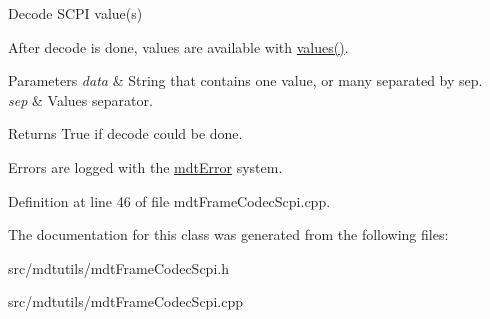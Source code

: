 Decode SCPI value(s) 

After decode is done, values are available with \hyperlink{classmdt_frame_codec_a2c0cc0f9d9b72ef2295b7ec7eca72ea7}{values()}.


\begin{DoxyParams}{Parameters}
{\em data} & String that contains one value, or many separated by sep. \\
\hline
{\em sep} & Values separator.\\
\hline
\end{DoxyParams}
\begin{DoxyReturn}{Returns}
True if decode could be done.
\end{DoxyReturn}
Errors are logged with the \hyperlink{classmdt_error}{mdtError} system. 

Definition at line 46 of file mdtFrameCodecScpi.cpp.



The documentation for this class was generated from the following files:\begin{DoxyCompactItemize}
\item 
src/mdtutils/mdtFrameCodecScpi.h\item 
src/mdtutils/mdtFrameCodecScpi.cpp\end{DoxyCompactItemize}
